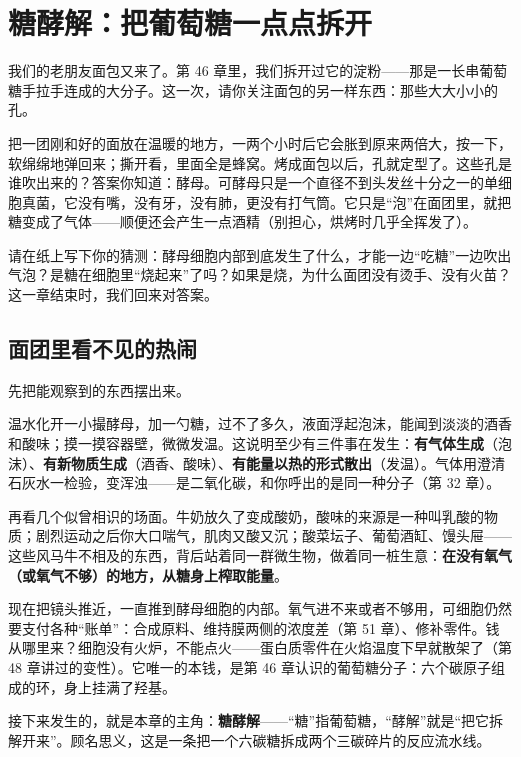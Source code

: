 \chapter{糖酵解：把葡萄糖一点点拆开}

\begin{kaichang}
我们的老朋友面包又来了。第 46 章里，我们拆开过它的淀粉——那是一长串葡萄糖手拉手连成的大分子。这一次，请你关注面包的另一样东西：那些大大小小的孔。

把一团刚和好的面放在温暖的地方，一两个小时后它会胀到原来两倍大，按一下，软绵绵地弹回来；撕开看，里面全是蜂窝。烤成面包以后，孔就定型了。这些孔是谁吹出来的？答案你知道：酵母。可酵母只是一个直径不到头发丝十分之一的单细胞真菌，它没有嘴，没有牙，没有肺，更没有打气筒。它只是“泡”在面团里，就把糖变成了气体——顺便还会产生一点酒精（别担心，烘烤时几乎全挥发了）。

请在纸上写下你的猜测：酵母细胞内部到底发生了什么，才能一边“吃糖”一边吹出气泡？是糖在细胞里“烧起来”了吗？如果是烧，为什么面团没有烫手、没有火苗？这一章结束时，我们回来对答案。
\end{kaichang}

\section{面团里看不见的热闹}

先把能观察到的东西摆出来。

温水化开一小撮酵母，加一勺糖，过不了多久，液面浮起泡沫，能闻到淡淡的酒香和酸味；摸一摸容器壁，微微发温。这说明至少有三件事在发生：\textbf{有气体生成}（泡沫）、\textbf{有新物质生成}（酒香、酸味）、\textbf{有能量以热的形式散出}（发温）。气体用澄清石灰水一检验，变浑浊——是二氧化碳，和你呼出的是同一种分子（第 32 章）。

再看几个似曾相识的场面。牛奶放久了变成酸奶，酸味的来源是一种叫乳酸的物质；剧烈运动之后你大口喘气，肌肉又酸又沉；酸菜坛子、葡萄酒缸、馒头屉——这些风马牛不相及的东西，背后站着同一群微生物，做着同一桩生意：\textbf{在没有氧气（或氧气不够）的地方，从糖身上榨取能量}。

现在把镜头推近，一直推到酵母细胞的内部。氧气进不来或者不够用，可细胞仍然要支付各种“账单”：合成原料、维持膜两侧的浓度差（第 51 章）、修补零件。钱从哪里来？细胞没有火炉，不能点火——蛋白质零件在火焰温度下早就散架了（第 48 章讲过的变性）。它唯一的本钱，是第 46 章认识的葡萄糖分子：六个碳原子组成的环，身上挂满了羟基。

接下来发生的，就是本章的主角：\textbf{糖酵解}——“糖”指葡萄糖，“酵解”就是“把它拆解开来”。顾名思义，这是一条把一个六碳糖拆成两个三碳碎片的反应流水线。

